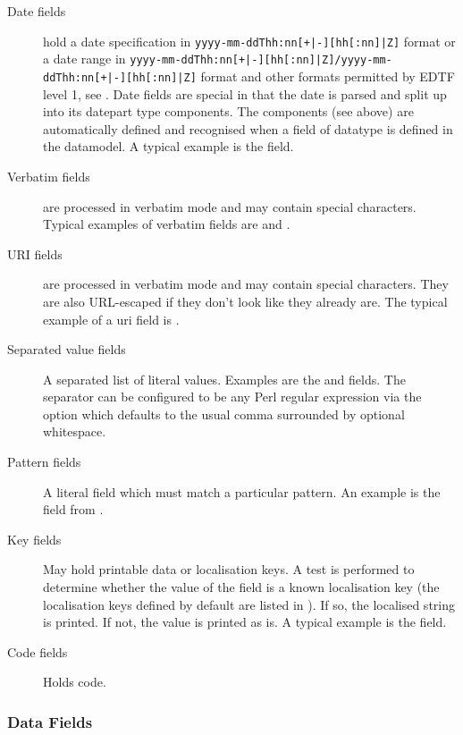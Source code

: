 \documentclass{ltxdockit}[2011/03/25]
\begin{document}
\begin{description}
\begin{description}
\item[Date fields] hold a date specification in \texttt{yyyy-mm-ddThh:nn[+|-][hh[:nn]|Z]} format or a date range in \texttt{yyyy-mm-ddThh:nn[+|-][hh[:nn]|Z]/yyyy-mm-ddThh:nn[+|-][hh[:nn]|Z]} format and other formats permitted by EDTF level 1, see . Date fields are special in that the date is parsed and split up into its datepart type components. The  components (see above) are automatically defined and recognised when a field of datatype  is defined in the datamodel. A typical example is the  field.

\item[Verbatim fields] are processed in verbatim mode and may contain special characters. Typical examples of verbatim fields are  and .

\item[URI fields] are processed in verbatim mode and may contain special characters. They are also URL-escaped if they don't look like they already are. The typical example of a uri field is .

\item[Separated value fields] A separated list of literal values. Examples are the  and  fields. The separator can be configured to be any Perl regular expression via the  option which defaults to the usual \bibtex comma surrounded by optional whitespace.

\item[Pattern fields] A literal field which must match a particular pattern. An example is the  field from .

\item[Key fields] May hold printable data or localisation keys. A test is performed to determine whether the value of the field is a known localisation key (the localisation keys defined by default are listed in ). If so, the localised string is printed. If not, the value is printed as is. A typical example is the  field.

\item[Code fields] Holds \tex code.

\end{description}
\end{description}

\subsubsection{Data Fields}
\label{bib:fld:dat}
\end{document}
